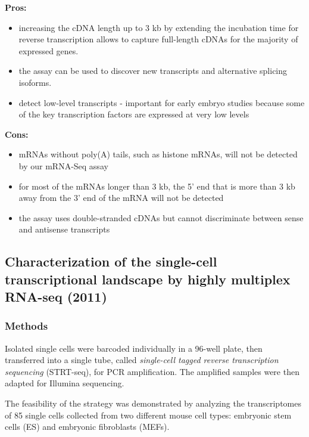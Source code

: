 \textbf{Pros:}

\begin{itemize}
\tightlist
\item
  increasing the cDNA length up to 3 kb by extending the incubation time
  for reverse transcription allows to capture full-length cDNAs for the
  majority of expressed genes.
\item
  the assay can be used to discover new transcripts and alternative
  splicing isoforms.
\item
  detect low-level transcripts - important for early embryo studies
  because some of the key transcription factors are expressed at very
  low levels
\end{itemize}

\textbf{Cons:}

\begin{itemize}
\tightlist
\item
  mRNAs without poly(A) tails, such as histone mRNAs, will not be
  detected by our mRNA-Seq assay
\item
  for most of the mRNAs longer than 3 kb, the 5' end that is more than 3
  kb away from the 3' end of the mRNA will not be detected
\item
  the assay uses double-stranded cDNAs but cannot discriminate between
  sense and antisense transcripts
\end{itemize}

\hypertarget{characterization-of-the-single-cell-transcriptional-landscape-by-highly-multiplex-rna-seq-2011}{%
\subsection{Characterization of the single-cell transcriptional
landscape by highly multiplex RNA-seq
(2011)}\label{characterization-of-the-single-cell-transcriptional-landscape-by-highly-multiplex-rna-seq-2011}}

\hypertarget{methods}{%
\subsubsection{Methods}\label{methods}}

Isolated single cells were barcoded individually in a 96-well plate,
then transferred into a single tube, called \emph{single-cell tagged
reverse transcription sequencing} (STRT-seq), for PCR amplification. The
amplified samples were then adapted for Illumina sequencing.

The feasibility of the strategy was demonstrated by analyzing the
transcriptomes of 85 single cells collected from two different mouse
cell types: embryonic stem cells (ES) and embryonic fibroblasts (MEFs).

